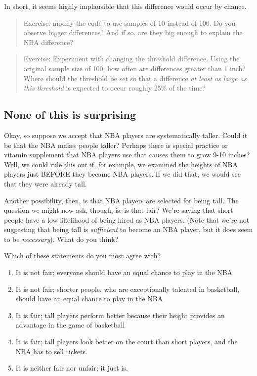 \documentclass[
  openany]{book}
\providecommand{\tightlist}{%
  \setlength{\itemsep}{0pt}\setlength{\parskip}{0pt}}
\begin{document}
In short, it seems highly implausible that this difference would occur by chance.

\begin{quote}
Exercise: modify the code to use samples of 10 instead of 100. Do you observe bigger differences? And if so, are they big enough to explain the NBA difference?
\end{quote}

\begin{quote}
Exercise: Experiment with changing the threshold difference. Using the original sample size of 100, how often are differences greater than 1 inch? Where should the threshold be set so that a difference \emph{at least as large as this threshold} is expected to occur roughly 25\% of the time?
\end{quote}

\hypertarget{none-of-this-is-surprising}{%
\subsection*{None of this is surprising}\label{none-of-this-is-surprising}}

Okay, so suppose we accept that NBA players are systematically taller. Could it be that the NBA makes people taller? Perhaps there is special practice or vitamin supplement that NBA players use that causes them to grow 9-10 inches? Well, we could rule this out if, for example, we examined the heights of NBA players just BEFORE they became NBA players. If we did that, we would see that they were already tall.

Another possibility, then, is that NBA players are selected for being tall. The question we might now ask, though, is: is that fair? We're saying that short people have a low likelihood of being hired as NBA players. (Note that we're not suggesting that being tall is \emph{sufficient} to become an NBA player, but it does seem to be \emph{necessary}). What do you think?

Which of these statements do you most agree with?

\begin{enumerate}
\def\labelenumi{\arabic{enumi}.}
\tightlist
\item
  It is not fair; everyone should have an equal chance to play in the NBA
\item
  It is not fair; shorter people, who are exceptionally talented in basketball, should have an equal chance to play in the NBA
\item
  It is fair; tall players perform better because their height provides an advantage in the game of basketball
\item
  It is fair; tall players look better on the court than short players, and the NBA has to sell tickets.
\item
  It is neither fair nor unfair; it just is.
\end{enumerate}
\end{document}
